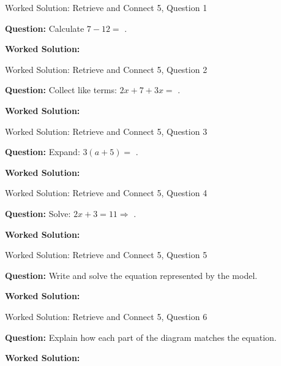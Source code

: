 \documentclass{beamer}
\newcommand{\ablank}[1]{%
  \alt<2>{\textcolor{red}{#1}}{\underline{\phantom{#1}}}%
}
\newcommand{\ashow}[1]{\uncover<2->{\textcolor{red}{\small #1}}}
\begin{document}
\begin{frame}{Worked Solution: Retrieve and Connect 5, Question 1}
\hypertarget{work-st5}{}

\textbf{Question:} Calculate $7-12=$\ablank{$-5$}.

\textbf{Worked Solution:} \ashow{$7-12=-(12-7)=-5$.}

\end{frame}

\begin{frame}{Worked Solution: Retrieve and Connect 5, Question 2}

\textbf{Question:} Collect like terms: $2x+7+3x=$\ablank{$5x+7$}.

\textbf{Worked Solution:} \ashow{$2x+3x=5x$; keep $+7$: $5x+7$.}

\end{frame}

\begin{frame}{Worked Solution: Retrieve and Connect 5, Question 3}

\textbf{Question:} Expand: $3(a+5)=$\ablank{$3a+15$}.

\textbf{Worked Solution:} \ashow{$3(a+5)=3a+15$.}

\end{frame}

\begin{frame}{Worked Solution: Retrieve and Connect 5, Question 4}

\textbf{Question:} Solve: $2x+3=11 \Rightarrow$\ablank{$x=4$}.

\textbf{Worked Solution:} \ashow{Subtract $3$: $2x=8$; divide by $2$: $x=4$.}

\end{frame}

\begin{frame}{Worked Solution: Retrieve and Connect 5, Question 5}

\textbf{Question:} Write and solve the equation represented by the model.

\textbf{Worked Solution:} \ashow{The model shows $2x+3=13$. Subtract $3$: $2x=10$, so $x=5$.}

\end{frame}

\begin{frame}{Worked Solution: Retrieve and Connect 5, Question 6}

\textbf{Question:} Explain how each part of the diagram matches the equation.

\textbf{Worked Solution:} \ashow{Two $x$-blocks give $2x$, the $3$-block is the constant $3$, and the total $13$ is written above them.}

\end{frame}
\end{document}
